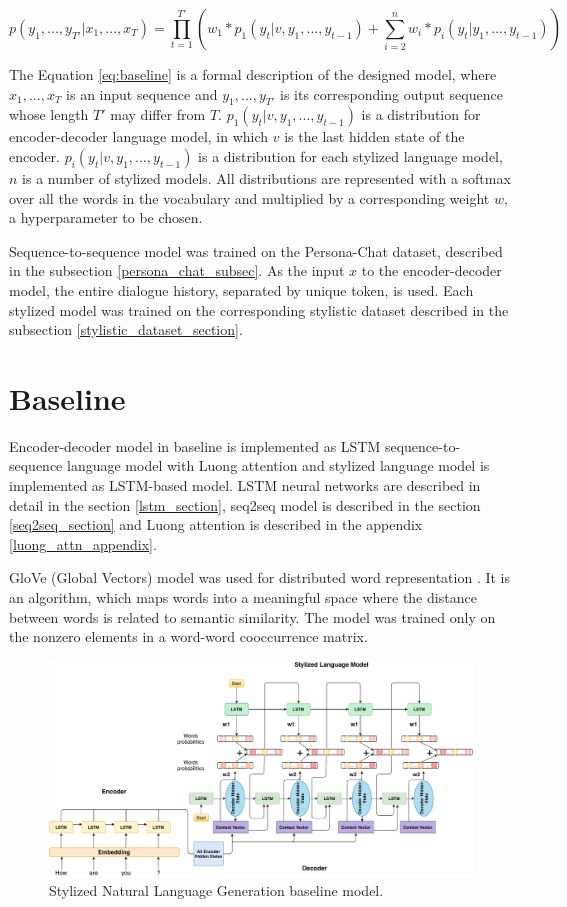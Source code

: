 \begin{equation} \label{eq:baseline}
p(y_1, ... , y_{T'}|x_1, ... , x_T) = \prod_{t=1}^{T'} ( w_1 * p_1(y_t|v, y_1, ... , y_{t-1}) + \sum_{i=2}^n w_i * p_i(y_t| y_1, ... , y_{t-1}))
\end{equation}

The Equation \ref{eq:baseline} is a formal description of the designed model, where $x_1, ... , x_T$ is an input sequence and $y_1, ... , y_{T'}$ is its corresponding output sequence whose length $T'$ may differ from $T$. $p_1(y_t|v, y_1, ... , y_{t-1})$ is a distribution for encoder-decoder language model, in which $v$ is the last hidden state of the encoder. $p_i(y_t|v, y_1, ... , y_{t-1})$ is a distribution for each stylized language model, $n$ is a number of stylized models. All distributions are represented with a softmax over all the words in the vocabulary and multiplied by a corresponding weight $w$, a hyperparameter to be chosen. 

Sequence-to-sequence model was trained on the Persona-Chat dataset, described in the subsection \ref{persona_chat_subsec}. As the input $x$ to the encoder-decoder model, the entire dialogue history, separated by unique token, is used. Each stylized model was trained on the corresponding stylistic dataset described in the subsection \ref{stylistic_dataset_section}.

\section{Baseline}
Encoder-decoder model in baseline is implemented as LSTM sequence-to-sequence language model with Luong attention and stylized language model is implemented as LSTM-based model. LSTM neural networks are described in detail in the section \ref{lstm_section}, seq2seq model is described in the section \ref{seq2seq_section} and Luong attention is described in the appendix \ref{luong_attn_appendix}.

GloVe (Global Vectors) model was used for distributed word representation \cite{pennington2014glove}. It is an algorithm, which maps words into a meaningful space where the distance between words is related to semantic similarity. The model was trained only on the nonzero elements in a word-word cooccurrence matrix.


\begin{figure}[hbt]
  \centering
  \includegraphics[width=1\textwidth]{figures/combine_models.pdf}
  \caption{Stylized Natural Language Generation baseline model.}
  \label{implementation_architecture}
\end{figure}


